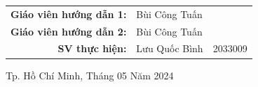 \begin{titlepage}
\begin{center}
\begin{tabular}{c}
            \\
            \hline
        \end{tabular}
    \end{center}

    \vspace{0.7cm}

    \begin{table}[h]
        \centering \large
        \begin{tabular}{rll}
            \textbf{Giáo viên hướng dẫn 1:} & Bùi Công Tuấn &         \\
            \textbf{Giáo viên hướng dẫn 2:} & Bùi Công Tuấn &         \\
            \textbf{SV thực hiện:}        & Lưu Quốc Bình & 2033009 \\
        \end{tabular}\label{tab:table}
    \end{table}

    \vspace{1.0cm}
    \begin{center}
    {\footnotesize Tp. Hồ Chí Minh, Tháng 05 Năm 2024}
    \end{center}
\end{titlepage}
